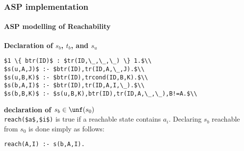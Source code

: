 \begin{frame}
\frametitle{ASP implementation}
 \framesubtitle{ASP modelling of Reachability}

\textbf{Declaration of $s_b$, $t_b$, and $s_u$} \\
\vspace{0.1in}
\begin{lstlisting}
$1 \{ btr(ID)$ : $tr(ID,\_,\_,\_) \} 1.$\\
$s(u,A,J)$ :- $btr(ID),tr(ID,A,\_,J).$\\
$s(u,B,K)$ :- $btr(ID),trcond(ID,B,K).$\\
$s(b,A,I)$ :- $btr(ID),tr(ID,A,I,\_).$\\
$s(b,B,K)$ :- $s(u,B,K),btr(ID),tr(ID,A,\_,\_),B!=A.$\\
\end{lstlisting}
\vspace{0.1in}
\textbf{\iIIIa declaration of $s_b\in\unf(s_0)$}\\
\vspace{0.1in}
\lstinline|reach($a$,$i$)|  is true if a
reachable state contains $a_i$.
Declaring $s_b$ reachable from $s_0$ is done simply as follows:\\
\vspace{0.1in}
\begin{lstlisting}
reach(A,I) :- s(b,A,I).
\end{lstlisting}
\vspace{0.1in}
\end{frame}

